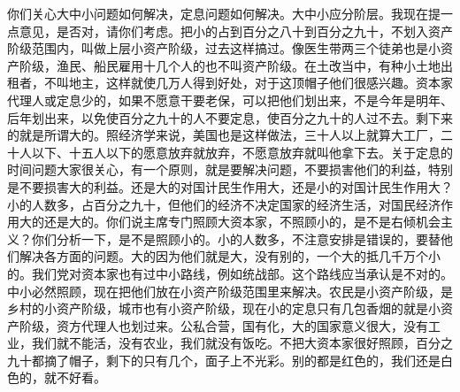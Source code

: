 你们关心大中小问题如何解决，定息问题如何解决。大中小应分阶层。我现在提一点意见，是否对，请你们考虑。把小的占到百分之八十到百分之九十，不划入资产阶级范围内，叫做上层小资产阶级，过去这样搞过。像医生带两三个徒弟也是小资产阶级，渔民、船民雇用十几个人的也不叫资产阶级。在土改当中，有种小土地出租者，不叫地主，这样就使几万人得到好处，对于这顶帽子他们很感兴趣。资本家代理人或定息少的，如果不愿意干要老保，可以把他们划出来，不是今年是明年、后年划出来，以免使百分之九十的人不要定息，使百分之九十的人过不去。剩下来的就是所谓大的。照经济学来说，美国也是这样做法，三十人以上就算大工厂，二十人以下、十五人以下的愿意放弃就放弃，不愿意放弃就叫他拿下去。关于定息的时间问题大家很关心，有一个原则，就是要解决问题，不要损害他们的利益，特别是不要损害大的利益。还是大的对国计民生作用大，还是小的对国计民生作用大？小的人数多，占百分之九十，但他们的经济不决定国家的经济生活，对国民经济作用大的还是大的。你们说主席专门照顾大资本家，不照顾小的，是不是右倾机会主义？你们分析一下，是不是照顾小的。小的人数多，不注意安排是错误的，要替他们解决各方面的问题。大的因为他们就是大，没有别的，一个大的抵几千万个小的。我们党对资本家也有过中小路线，例如统战部。这个路线应当承认是不对的。中小必然照顾，现在把他们放在小资产阶级范围里来解决。农民是小资产阶级，是乡村的小资产阶级，城市也有小资产阶级，现在小的定息只有几包香烟的就是小资产阶级，资方代理人也划过来。公私合营，国有化，大的国家意义很大，没有工业，我们就不能活，没有农业，我们就没有饭吃。不把大资本家很好照顾，百分之九十都摘了帽子，剩下的只有几个，面子上不光彩。别的都是红色的，我们还是白色的，就不好看。

